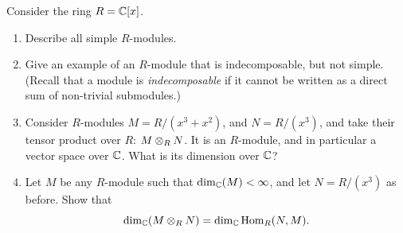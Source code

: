 \begin{question}[subtitle = January 2017 Problem 5,ID=Jan17_5]
Consider the ring $R = \mathbb{C}[x]$.
\begin{enumerate}
    \item Describe all simple $R$-modules.
    \item Give an example of an $R$-module that is indecomposable, but not simple. (Recall that a module is \emph{indecomposable} if it cannot be written as a direct sum of non-trivial submodules.)
    \item Consider $R$-modules $M = R/(x^3+x^2)$, and $N = R/(x^3)$, and take their tensor product over $R$: $M \otimes_R N$. It is an $R$-module, and in particular a vector space over $\mathbb{C}$. What is its dimension over $\mathbb{C}$?
    \item Let $M$ be any $R$-module such that $\dim_{\mathbb{C}}(M) < \infty$, and let $N = R/(x^3)$ as before. Show that
    \[\dim_{\mathbb{C}}(M \otimes_R N) = \dim_{\mathbb{C}} \operatorname{Hom}_R(N,M).\]
\end{enumerate}
\end{question}
